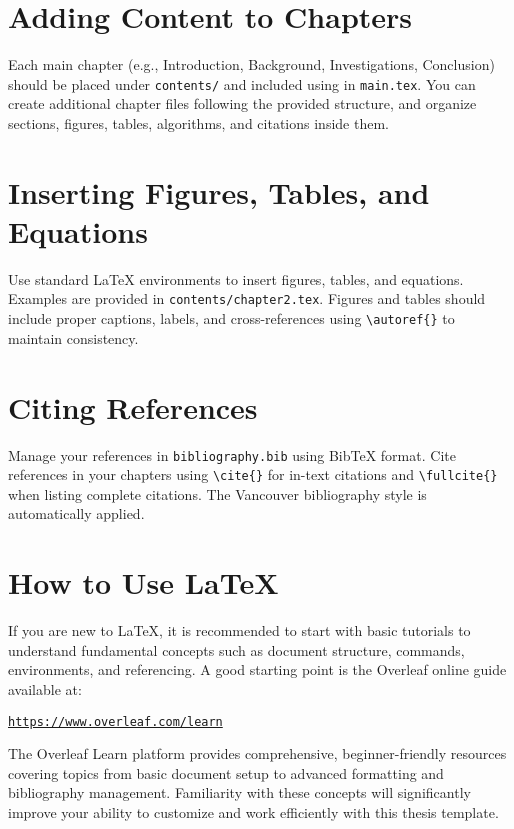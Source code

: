 \section{Adding Content to Chapters}
\begin{paragraph}
Each main chapter (e.g., Introduction, Background, Investigations, Conclusion) should be placed under \texttt{contents/} and included using \verb|| in \texttt{main.tex}. You can create additional chapter files following the provided structure, and organize sections, figures, tables, algorithms, and citations inside them.
\end{paragraph}

\section{Inserting Figures, Tables, and Equations}
\begin{paragraph}
Use standard LaTeX environments to insert figures, tables, and equations. Examples are provided in \texttt{contents/chapter2.tex}. Figures and tables should include proper captions, labels, and cross-references using \verb|\autoref{}| to maintain consistency.
\end{paragraph}

\section{Citing References}
\begin{paragraph}
Manage your references in \texttt{bibliography.bib} using BibTeX format. Cite references in your chapters using \verb|\cite{}| for in-text citations and \verb|\fullcite{}| when listing complete citations. The Vancouver bibliography style is automatically applied.
\end{paragraph}

\section{How to Use \LaTeX}
\begin{paragraph}
If you are new to \LaTeX, it is recommended to start with basic tutorials to understand fundamental concepts such as document structure, commands, environments, and referencing. A good starting point is the Overleaf online guide available at:

\begin{center}
\href{https://www.overleaf.com/learn}{\texttt{https://www.overleaf.com/learn}}
\end{center}

The Overleaf Learn platform provides comprehensive, beginner-friendly resources covering topics from basic document setup to advanced formatting and bibliography management. Familiarity with these concepts will significantly improve your ability to customize and work efficiently with this thesis template.
\end{paragraph}

